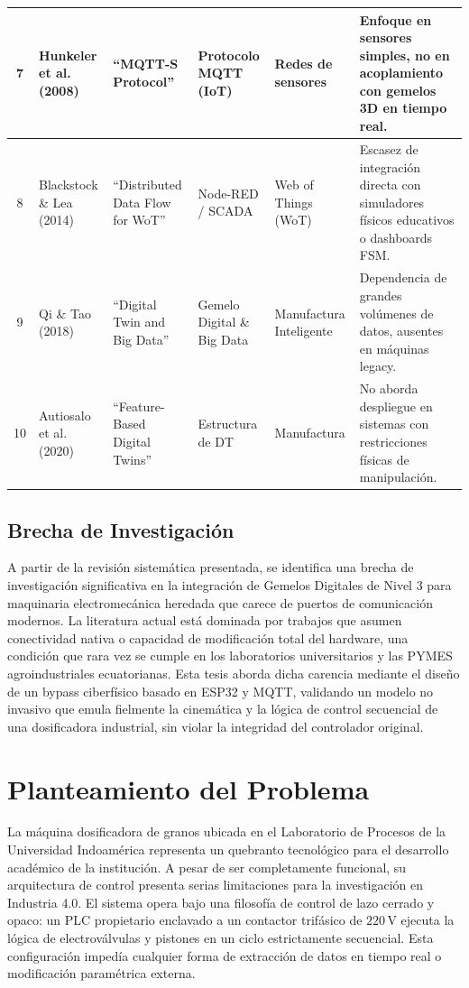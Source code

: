 {\begin{longtable}{|c|p{1.5cm}|p{3.2cm}|p{2.5cm}|p{2cm}|p{3cm}|}
7 & Hunkeler et al. (2008) & ``MQTT-S Protocol'' \cite{hunkeler2008} & Protocolo MQTT (IoT) & Redes de sensores & Enfoque en sensores simples, no en acoplamiento con gemelos 3D en tiempo real. \\ \hline
8 & Blackstock \& Lea (2014) & ``Distributed Data Flow for WoT'' \cite{blackstock2014} & Node-RED / SCADA & Web of Things (WoT) & Escasez de integración directa con simuladores físicos educativos o dashboards FSM. \\ \hline
9 & Qi \& Tao (2018) & ``Digital Twin and Big Data'' \cite{qi2018} & Gemelo Digital \& Big Data & Manufactura Inteligente & Dependencia de grandes volúmenes de datos, ausentes en máquinas legacy. \\ \hline
10 & Autiosalo et al. (2020) & ``Feature-Based Digital Twins'' \cite{autiosalo2020} & Estructura de DT & Manufactura & No aborda despliegue en sistemas con restricciones físicas de manipulación. \\
\end{longtable}}

\subsection{Brecha de Investigación}
A partir de la revisión sistemática presentada, se identifica una brecha de investigación significativa en la integración de Gemelos Digitales de Nivel 3 para maquinaria electromecánica heredada que carece de puertos de comunicación modernos. La literatura actual está dominada por trabajos que asumen conectividad nativa o capacidad de modificación total del hardware, una condición que rara vez se cumple en los laboratorios universitarios y las PYMES agroindustriales ecuatorianas. Esta tesis aborda dicha carencia mediante el diseño de un bypass ciberfísico basado en ESP32 y MQTT, validando un modelo no invasivo que emula fielmente la cinemática y la lógica de control secuencial de una dosificadora industrial, sin violar la integridad del controlador original.

\section{Planteamiento del Problema}
La máquina dosificadora de granos ubicada en el Laboratorio de Procesos de la Universidad Indoamérica representa un quebranto tecnológico para el desarrollo académico de la institución. A pesar de ser completamente funcional, su arquitectura de control presenta serias limitaciones para la investigación en Industria 4.0. El sistema opera bajo una filosofía de control de lazo cerrado y opaco: un PLC propietario enclavado a un contactor trifásico de $220\,\text{V}$ ejecuta la lógica de electroválvulas y pistones en un ciclo estrictamente secuencial. Esta configuración impedía cualquier forma de extracción de datos en tiempo real o modificación paramétrica externa.

